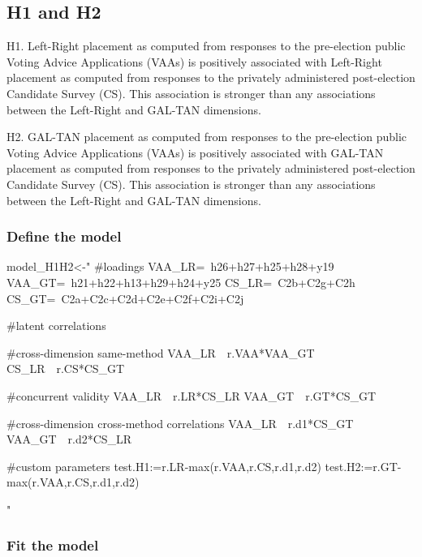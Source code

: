 \documentclass[
]{article}
\newenvironment{Shaded}{\begin{snugshade}}{\end{snugshade}}
\newcommand{\NormalTok}[1]{#1}
\newcommand{\StringTok}[1]{\textcolor[rgb]{0.31,0.60,0.02}{#1}}
\begin{document}
\hypertarget{h1-and-h2}{%
\subsection{H1 and H2}\label{h1-and-h2}}

H1. Left-Right placement as computed from responses to the pre-election
public Voting Advice Applications (VAAs) is positively associated with
Left-Right placement as computed from responses to the privately
administered post-election Candidate Survey (CS). This association is
stronger than any associations between the Left-Right and GAL-TAN
dimensions.

H2. GAL-TAN placement as computed from responses to the pre-election
public Voting Advice Applications (VAAs) is positively associated with
GAL-TAN placement as computed from responses to the privately
administered post-election Candidate Survey (CS). This association is
stronger than any associations between the Left-Right and GAL-TAN
dimensions.

\hypertarget{define-the-model}{%
\subsubsection{Define the model}\label{define-the-model}}

\begin{Shaded}
\begin{Highlighting}[]
\NormalTok{model_H1H2<-}\StringTok{"}
\StringTok{#loadings}
\StringTok{VAA_LR=~h26+h27+h25+h28+y19}
\StringTok{VAA_GT=~h21+h22+h13+h29+h24+y25}
\StringTok{CS_LR=~C2b+C2g+C2h}
\StringTok{CS_GT=~C2a+C2c+C2d+C2e+C2f+C2i+C2j}

\StringTok{#latent correlations}

\StringTok{#cross-dimension same-method}
\StringTok{VAA_LR~~r.VAA*VAA_GT}
\StringTok{CS_LR~~r.CS*CS_GT}

\StringTok{#concurrent validity}
\StringTok{VAA_LR~~r.LR*CS_LR}
\StringTok{VAA_GT~~r.GT*CS_GT}

\StringTok{#cross-dimension cross-method correlations}
\StringTok{VAA_LR~~r.d1*CS_GT}
\StringTok{VAA_GT~~r.d2*CS_LR}

\StringTok{#custom parameters}
\StringTok{test.H1:=r.LR-max(r.VAA,r.CS,r.d1,r.d2)}
\StringTok{test.H2:=r.GT-max(r.VAA,r.CS,r.d1,r.d2)}

\StringTok{"}
\end{Highlighting}
\end{Shaded}

\hypertarget{fit-the-model}{%
\subsubsection{Fit the model}\label{fit-the-model}}
\end{document}
